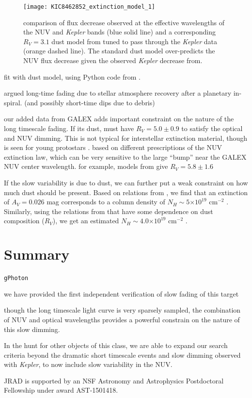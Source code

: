 \documentclass[twocolumn]{aastex6}
\providecommand{\e}[1]{\ensuremath{\times 10^{#1}}}
\newcommand{\Kepler}{\textsl{Kepler}\xspace}
\begin{document}
\begin{figure}[!t]
\centering
\texttt{[image: KIC8462852\_extinction\_model\_1]}
\caption{comparison of flux decrease observed at the effective wavelengths of the NUV and \Kepler bands (blue solid line) and a corresponding $R_V=3.1$ dust model from \citet{cardelli1989} tuned to pass through the \Kepler data (orange dashed line). The standard dust model over-predicts the NUV flux decrease given the observed \Kepler decrease from\citet{montet2016}.}
\label{fig:dust}
\end{figure}


fit with \citet{cardelli1989} dust model, using Python code from \citet{barbary2016}.



\citet{metzger2017} argued long-time fading due to stellar atmosphere recovery after a planetary in-spiral. (and possibly short-time dips due to debris) 

our added data from GALEX adds important constraint on the nature of the long timescale fading. If its dust, must have $R_V=5.0\pm0.9$ to satisfy the optical and NUV dimming. This is not typical for interstellar extinction material, though is seen for young protostars \citep[e.g.][]{hecht1982}. based on different prescriptions of the NUV extinction law, which can be very sensitive to the large ``bump'' near the GALEX NUV center wavelength.  
for example, models from \citet{fitzpatrick2009}give $R_V=5.8\pm1.6$


If the slow variability is due to dust, we can further put a weak constraint on how much dust should be present. Based on relations from \citep{guver2009}, we find that an extinction of $A_V = 0.026$ mag corresponds to 
a column density of $N_H\sim5\e{19}$ cm$^{-2}$ . Similarly, using the relations from \citet{rachford2002} that have some dependence on dust composition ($R_V$), we get an estimated $N_H\sim4.0\e{19}$ cm$^{-2}$ .




\section{Summary}
\label{sec:summary}

{\tt gPhoton}

we have provided the first independent verification of slow fading of this target

though the long timescale light curve is very sparsely sampled, the combination of NUV and optical wavelengths provides a powerful constrain on the nature of this slow dimming. 

In the hunt for other objects of this class, we are able to expand our search criteria beyond the dramatic short timescale events and slow dimming observed with \Kepler, to now include slow variability in the NUV. 



\acknowledgments
JRAD is supported by an NSF Astronomy and Astrophysics Postdoctoral Fellowship under award AST-1501418. 



\end{document}
